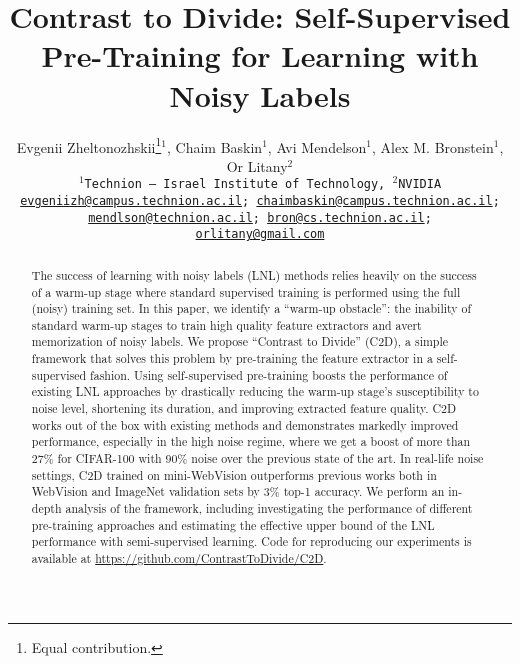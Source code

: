\documentclass[10pt,twocolumn,letterpaper]{article}
\begin{document}
\title{Contrast to Divide: Self-Supervised Pre-Training for Learning with Noisy Labels}

\newcommand*\samethanks[1][\value{footnote}]{\footnotemark[#1]}
\author{Evgenii Zheltonozhskii\thanks{Equal contribution.}\hspace{4pt}$^{1}$,
Chaim Baskin\samethanks[1]\hspace{4pt}$^{1}$,
Avi Mendelson$^{1}$,
Alex M. Bronstein$^{1}$,
Or Litany$^{2}$\\
    {\tt\small $^{1}$Technion -- Israel Institute of Technology, $^{2}$NVIDIA}\\
{\tt\small \href{mailto:evgeniizh@campus.technion.ac.il}{evgeniizh@campus.technion.ac.il};
\href{mailto:chaimbaskin@campus.technion.ac.il}{chaimbaskin@campus.technion.ac.il};}\\
{\tt\small \href{mailto:mendlson@technion.ac.il}{mendlson@technion.ac.il};
\href{mailto:bron@cs.technion.ac.il}{bron@cs.technion.ac.il};}\\
{\tt\small \href{mailto:orlitany@gmail.com}{orlitany@gmail.com}}

}


\maketitle


\begin{abstract}
The success of learning with noisy labels (LNL) methods  relies heavily on the success of a warm-up stage where standard supervised training is performed using the full (noisy) training set. 
In this paper, we identify a ``warm-up obstacle'': the inability of standard warm-up stages to train high quality feature extractors and avert memorization of noisy labels. 
We propose ``Contrast to Divide'' (C2D), a simple framework that solves this problem by pre-training the feature extractor in a self-supervised fashion. 
Using self-supervised pre-training boosts the performance of existing LNL approaches by drastically reducing the warm-up stage's susceptibility to noise level, shortening its duration, and improving extracted feature quality. 
C2D works out of the box with existing methods and demonstrates markedly improved performance, especially in the high noise regime, where we get a boost of more than 27\% for CIFAR-100 with 90\% noise over the previous state of the art.
In real-life noise settings, C2D trained on mini-WebVision outperforms previous works both in WebVision and ImageNet validation sets by 3\% top-1 accuracy. 
We perform an in-depth analysis of the framework, including investigating the performance of different pre-training approaches and estimating the effective upper bound of the LNL performance with semi-supervised learning.
Code for reproducing our experiments is available at \url{https://github.com/ContrastToDivide/C2D}. 
\end{abstract}
\end{document}
